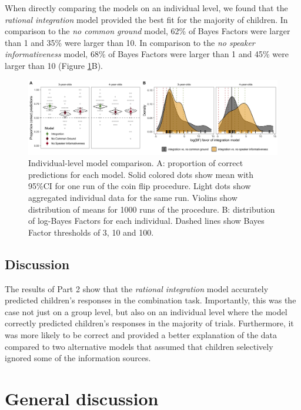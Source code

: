 \documentclass[
  man,floatsintext]{apa6}
\begin{document}
When directly comparing the models on an individual level, we found that the \emph{rational integration} model provided the best fit for the majority of children. In comparison to the \emph{no common ground} model, 62\% of Bayes Factors were larger than 1 and 35\% were larger than 10. In comparison to the \emph{no speaker informativeness} model, 68\% of Bayes Factors were larger than 1 and 45\% were larger than 10 (Figure \ref{fig:fig4}B).

\begin{figure}
\includegraphics[width=1\linewidth]{./figures/fig4} \caption{Individual-level model comparison. A: proportion of correct predictions for each model. Solid colored dots show mean with 95\%CI for one run of the coin flip procedure. Light dots show aggregated individual data for the same run. Violins show distribution of means for 1000 runs of the procedure. B: distribution of log-Bayes Factors for each individual. Dashed lines show Bayes Factor thresholds of 3, 10 and 100.}\label{fig:fig4}
\end{figure}

\hypertarget{discussion-1}{%
\subsection{Discussion}\label{discussion-1}}

The results of Part 2 show that the \emph{rational integration} model accurately predicted children's responses in the combination task. Importantly, this was the case not just on a group level, but also on an individual level where the model correctly predicted children's responses in the majority of trials. Furthermore, it was more likely to be correct and provided a better explanation of the data compared to two alternative models that assumed that children selectively ignored some of the information sources.

\hypertarget{general-discussion}{%
\section{General discussion}\label{general-discussion}}
\end{document}
